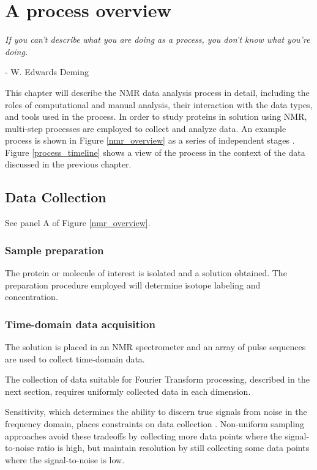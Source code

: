 \chapter{A process overview}

\begin{center}
  \textit{If you can't describe what you are doing as a process, you don't 
          know what you're doing.}

 - W. Edwards Deming
\end{center}

This chapter will describe the NMR data analysis process in detail,
including the roles of computational and manual analysis, their interaction
with the data types, and tools used in the process.
In order to study proteins in solution using NMR, multi-step processes are 
employed to collect and analyze data.  An example process is shown in 
Figure \ref{nmr_overview} as a series of independent stages 
\cite{guerry2011automated}.
Figure \ref{process_timeline} shows a view of the process in the context
of the data discussed in the previous chapter.



\section{Data Collection}

See panel A of Figure \ref{nmr_overview}.

\subsection*{Sample preparation}
The protein or molecule of interest is isolated and a solution 
obtained.  The preparation procedure employed will determine isotope labeling
and concentration.

\subsection*{Time-domain data acquisition}
The solution is placed in an NMR spectrometer and an array of pulse sequences
are used to collect time-domain data.

The collection of data suitable for Fourier Transform processing, described
in the next section, requires uniformly collected data in each dimension.

Sensitivity, which determines the ability to discern true signals
from noise in the frequency domain, places constraints on data collection
\cite{rovnyak2004accelerated}.  Non-uniform sampling approaches 
\cite{maciejewski2011random} avoid these tradeoffs by collecting more data
points where the signal-to-noise ratio is high, but maintain resolution by
still collecting some data points where the signal-to-noise is low.


